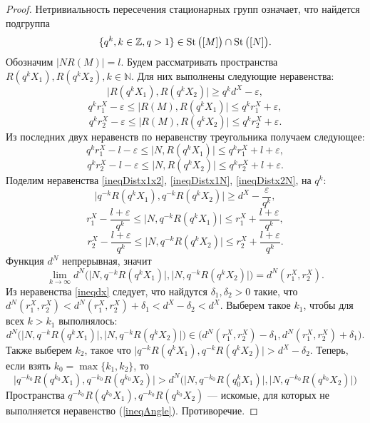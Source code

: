 \begin{proof}
  Нетривиальность пересечения стационарных групп означает, что найдется
  подгруппа \[
    \{q^k, k\in \mathbb{Z}, q> 1\} \in \operatorname{St}\big([M]\big) \cap \operatorname{St}
    \big([N]\big).
  \]
  Обозначим \( |N R(M)| = l \). Будем рассматривать пространства \(
  R(q^k X_1), R(q^k X_2), k \in \mathbb{N} \). Для них выполнены
  следующие неравенства:
  \begin{equation}
    \big| R(q^k X_1), R(q^k X_2) \big| \ge q^k d^X - \varepsilon,
    \label{ineqDistx1x2}
  \end{equation}
  \[
    q^k r_1^X - \varepsilon  \le\big | R(M), R(q^k X_1) \big| \le q^k
    r_1^X + \varepsilon ,
  \]
  \[
    q^k r_2^X - \varepsilon  \le\big | R(M), R(q^k X_2) \big| \le q^k
    r_2^X + \varepsilon .
  \]
  Из последних двух неравенств по неравенству треугольника получаем
  следующее:
  \begin{equation}
    q^k r_1^X - l - \varepsilon \le \big|N, R(q^k X_1) \big| \le
    q^k r_1^X + l + \varepsilon,\label{ineqDistx1N}
  \end{equation}
  \begin{equation}
    q^k r_2^X - l - \varepsilon \le \big|N, R(q^k X_2) \big| \le q^k
    r_2^X + l + \varepsilon.\label{ineqDistx2N}
  \end{equation}
  Поделим неравенства \ref{ineqDistx1x2}, \ref{ineqDistx1N},
  \ref{ineqDistx2N}, на \( q^k \):
  \[ \big| q^{-k}R(q^k X_1), q^{-k}R(q^k X_2) \big| \ge d^X -
  \frac{\varepsilon }{q^k}, \]
  \[
    r_1^X - \frac{l + \varepsilon}{q^k} \le \big|N, q^{-k}R(q^k X_1)
    \big| \le
    r_1^X + \frac{l + \varepsilon}{q^k},
  \]
  \[
    r_2^X - \frac{l + \varepsilon}{q^k} \le \big|N, q^{-k}R(q^k X_2)
    \big| \le
    r_2^X + \frac{l + \varepsilon}{q^k}.
  \]
  Функция \( d^N \) непрерывная, значит
  \[
    \lim_{k \rightarrow \infty
    }d^N\Big(\big|N, q^{-k}R(q^k X_1)
      \big|, \big|N, q^{-k}R(q^k X_2)
    \big|\Big) = d^N(r_1^X, r_2^X).
  \]
  Из неравенства \ref{ineqdx} следует, что найдутся \( \delta
    _1, \delta _2
  > 0 \) такие, что \( d^N(r_1^X,r_2^X)<d^N(r_1^X, r_2^X)+\delta
  _1 < d^X- \delta _2 < d^X \). Выберем такое \( k_1 \), чтобы
  для всех \( k > k_1 \) выполнялось:
  \[
    d^N\Big(\big|N, q^{-k}R(q^k X_1)
      \big|, \big|N, q^{-k}R(q^k X_2)
    \big|\Big) \in \big(d^N(r_1^X, r_2^X)- \delta _1,
  d^N(r_1^X, r_2^X)+ \delta _1\big).  \]
  Также выберем \( k_2 \), такое что \( \big| q^{-k}R(q^k X_1),
  q^{-k}R(q^k X_2) \big| > d^X - \delta _2 \).
  Теперь, если взять \( k_0 = \max\{k_1,k_2\} \), то
  \[ \big| q^{-k_0}R(q^{k_0} X_1), q^{-k_0}R(q^{k_0} X_2) \big|
    > d^N\Big(\big|N, q^{-k_0}R(q^k_0 X_1) \big|, \big|N,
  q^{-k_0}R(q^{k_0} X_2) \big|\Big) \]
  Пространства \( q^{-k_0}R(q^{k_0}X_1), q^{-k_0}R(q^{k_0}X_2)\)
  ---
  искомые, для которых не выполняется неравенство (\ref{ineqAngle}).
  Противоречие.
\end{proof}
